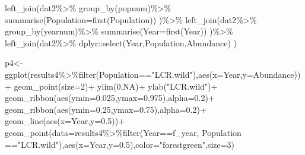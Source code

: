 \documentclass[
]{article}
\newenvironment{Shaded}{\begin{snugshade}}{\end{snugshade}}
\newcommand{\AttributeTok}[1]{\textcolor[rgb]{0.77,0.63,0.00}{#1}}
\newcommand{\ConstantTok}[1]{\textcolor[rgb]{0.00,0.00,0.00}{#1}}
\newcommand{\DecValTok}[1]{\textcolor[rgb]{0.00,0.00,0.81}{#1}}
\newcommand{\FloatTok}[1]{\textcolor[rgb]{0.00,0.00,0.81}{#1}}
\newcommand{\FunctionTok}[1]{\textcolor[rgb]{0.00,0.00,0.00}{#1}}
\newcommand{\NormalTok}[1]{#1}
\newcommand{\OtherTok}[1]{\textcolor[rgb]{0.56,0.35,0.01}{#1}}
\newcommand{\SpecialCharTok}[1]{\textcolor[rgb]{0.00,0.00,0.00}{#1}}
\newcommand{\StringTok}[1]{\textcolor[rgb]{0.31,0.60,0.02}{#1}}
\begin{document}
\begin{Shaded}
\begin{Highlighting}[]
  \FunctionTok{left\_join}\NormalTok{(dat2}\SpecialCharTok{\%\textgreater{}\%}
              \FunctionTok{group\_by}\NormalTok{(popnum)}\SpecialCharTok{\%\textgreater{}\%}
              \FunctionTok{summarise}\NormalTok{(}\AttributeTok{Population=}\FunctionTok{first}\NormalTok{(Population))}
\NormalTok{            )}\SpecialCharTok{\%\textgreater{}\%}
  \FunctionTok{left\_join}\NormalTok{(dat2}\SpecialCharTok{\%\textgreater{}\%}
              \FunctionTok{group\_by}\NormalTok{(yearnum)}\SpecialCharTok{\%\textgreater{}\%}
              \FunctionTok{summarise}\NormalTok{(}\AttributeTok{Year=}\FunctionTok{first}\NormalTok{(Year))}
\NormalTok{            )}\SpecialCharTok{\%\textgreater{}\%}
  \FunctionTok{left\_join}\NormalTok{(dat2}\SpecialCharTok{\%\textgreater{}\%}
\NormalTok{              dplyr}\SpecialCharTok{::}\FunctionTok{select}\NormalTok{(Year,Population,Abundance)}
\NormalTok{            )}

\NormalTok{p4}\OtherTok{\textless{}{-}}\FunctionTok{ggplot}\NormalTok{(results4}\SpecialCharTok{\%\textgreater{}\%}\FunctionTok{filter}\NormalTok{(Population}\SpecialCharTok{==}\StringTok{"LCR.wild"}\NormalTok{),}\FunctionTok{aes}\NormalTok{(}\AttributeTok{x=}\NormalTok{Year,}\AttributeTok{y=}\NormalTok{Abundance))}\SpecialCharTok{+}
  \FunctionTok{geom\_point}\NormalTok{(}\AttributeTok{size=}\DecValTok{2}\NormalTok{)}\SpecialCharTok{+}
  \FunctionTok{ylim}\NormalTok{(}\DecValTok{0}\NormalTok{,}\ConstantTok{NA}\NormalTok{)}\SpecialCharTok{+}
  \FunctionTok{ylab}\NormalTok{(}\StringTok{"LCR.wild"}\NormalTok{)}\SpecialCharTok{+}
  \FunctionTok{geom\_ribbon}\NormalTok{(}\FunctionTok{aes}\NormalTok{(}\AttributeTok{ymin=}\StringTok{\textasciigrave{}}\AttributeTok{0.025}\StringTok{\textasciigrave{}}\NormalTok{,}\AttributeTok{ymax=}\StringTok{\textasciigrave{}}\AttributeTok{0.975}\StringTok{\textasciigrave{}}\NormalTok{),}\AttributeTok{alpha=}\FloatTok{0.2}\NormalTok{)}\SpecialCharTok{+}
  \FunctionTok{geom\_ribbon}\NormalTok{(}\FunctionTok{aes}\NormalTok{(}\AttributeTok{ymin=}\StringTok{\textasciigrave{}}\AttributeTok{0.25}\StringTok{\textasciigrave{}}\NormalTok{,}\AttributeTok{ymax=}\StringTok{\textasciigrave{}}\AttributeTok{0.75}\StringTok{\textasciigrave{}}\NormalTok{),}\AttributeTok{alpha=}\FloatTok{0.2}\NormalTok{)}\SpecialCharTok{+}
  \FunctionTok{geom\_line}\NormalTok{(}\FunctionTok{aes}\NormalTok{(}\AttributeTok{x=}\NormalTok{Year,}\AttributeTok{y=}\StringTok{\textasciigrave{}}\AttributeTok{0.5}\StringTok{\textasciigrave{}}\NormalTok{))}\SpecialCharTok{+}
  \FunctionTok{geom\_point}\NormalTok{(}\AttributeTok{data=}\NormalTok{results4}\SpecialCharTok{\%\textgreater{}\%}\FunctionTok{filter}\NormalTok{(Year}\SpecialCharTok{==}\NormalTok{f\_year, Population }\SpecialCharTok{==}\StringTok{"LCR.wild"}\NormalTok{),}\FunctionTok{aes}\NormalTok{(}\AttributeTok{x=}\NormalTok{Year,}\AttributeTok{y=}\StringTok{\textasciigrave{}}\AttributeTok{0.5}\StringTok{\textasciigrave{}}\NormalTok{),}\AttributeTok{color=}\StringTok{"forestgreen"}\NormalTok{,}\AttributeTok{size=}\DecValTok{3}\NormalTok{)}


\end{Highlighting}
\end{Shaded}
\end{document}
